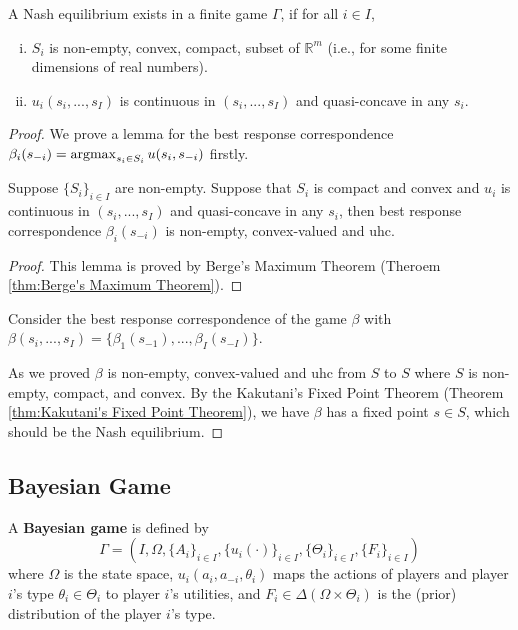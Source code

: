 \documentclass[11pt]{elegantbook}
\newcommand{\argmax}{\operatornamewithlimits{argmax}}
\begin{document}
\begin{theorem}
    A Nash equilibrium exists in a finite game $\Gamma$, if for all $i\in I$,
    \begin{enumerate}[(i).]
        \item $S_i$ is non-empty, convex, compact, subset of $\mathbb{R}^m$ (i.e., for some finite dimensions of real numbers).
        \item $u_i(s_i,...,s_I)$ is continuous in $(s_i,...,s_I)$ and quasi-concave in any $s_i$.
    \end{enumerate}
\end{theorem}
\begin{proof}
    We prove a lemma for the best response correspondence $\beta_i(s_{-i})=\argmax_{s_i\in S_i}u(s_i,s_{-i})$ firstly.
    \begin{lemma}
        Suppose $\{S_i\}_{i\in I}$ are non-empty. Suppose that $S_i$ is compact and convex and $u_i$ is continuous in $(s_i,...,s_I)$ and quasi-concave in any $s_i$, then best response correspondence $\beta_i(s_{-i})$ is non-empty, convex-valued and uhc.
    \end{lemma}
    \begin{proof}
        This lemma is proved by Berge's Maximum Theorem (Theroem \ref{thm:Berge's Maximum Theorem}).
    \end{proof}
    Consider the best response correspondence of the game $\beta$ with $\beta(s_i,...,s_I)=\{\beta_1(s_{-1}),...,\beta_I(s_{-I})\}$.

    As we proved $\beta$ is non-empty, convex-valued and uhc from $S$ to $S$ where $S$ is non-empty, compact, and convex. By the Kakutani's Fixed Point Theorem (Theorem \ref{thm:Kakutani's Fixed Point Theorem}), we have $\beta$ has a fixed point $s\in S$, which should be the Nash equilibrium.
\end{proof}

\subsection{Bayesian Game}
\begin{definition}
    \normalfont
    A \textbf{Bayesian game} is defined by $$\Gamma=(I, \Omega, \{A_i\}_{i\in I}, \{u_i(\cdot)\}_{i\in I},\{\Theta_i\}_{i\in I}, \{F_i\}_{i\in I})$$
    where $\Omega$ is the state space, $u_i(a_i,a_{-i},\theta_i)$ maps the actions of players and player $i$'s type $\theta_i\in \Theta_i$ to player $i$'s utilities, and $F_i\in\Delta\left(\Omega\times\Theta_i\right)$ is the (prior) distribution of the player $i$'s type.
\end{definition}
\end{document}
